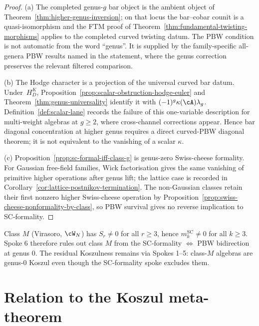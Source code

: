 \begin{proof}
(a) The completed genus-$g$ bar object is the ambient object of
Theorem~\ref{thm:higher-genus-inversion}; on that locus the
bar--cobar counit is a quasi-isomorphism and the FTM proof of
Theorem~\ref{thm:fundamental-twisting-morphisms} applies to the
completed curved twisting datum.  The PBW condition is not automatic
from the word ``genus''.  It is supplied by the family-specific
all-genera PBW results named in the statement, where the genus
correction preserves the relevant filtered comparison.

(b) The Hodge character is a projection of the universal curved bar
datum.  Under~$H_D^K$, Proposition~\ref{prop:scalar-obstruction-hodge-euler}
and Theorem~\ref{thm:genus-universality} identify it with
$(-1)^g\kappa(\cA)\lambda_g$.  Definition~\ref{def:scalar-lane}
records the failure of this one-variable description for multi-weight
algebras at $g\geq 2$, where cross-channel corrections appear.  Hence
bar diagonal concentration at higher genus requires a direct
curved-PBW diagonal theorem; it is not equivalent to the vanishing of
a scalar $\kappa$.

(c) Proposition~\ref{prop:sc-formal-iff-class-g} is genus-zero
Swiss-cheese formality.  For Gaussian free-field families, Wick
factorisation gives the same vanishing of primitive higher operations
after genus lift; the lattice case is recorded in
Corollary~\ref{cor:lattice-postnikov-termination}.  The non-Gaussian
classes retain their first nonzero higher Swiss-cheese operation by
Proposition~\ref{prop:swiss-cheese-nonformality-by-class}, so PBW
survival gives no reverse implication to SC-formality.
\end{proof}

\begin{remark}
\label{rem:spoke-6-class-M}
Class $M$ (Virasoro, $\cW_N$) has $S_r \neq 0$ for all $r \geq 3$,
hence $m_k^{\mathrm{SC}} \neq 0$ for all $k \geq 3$. Spoke 6
therefore rules out class $M$ from the SC-formality $\Leftrightarrow$
PBW bidirection at genus $0$. The residual Koszulness remains via
Spokes 1--5: class-$M$ algebras are genus-$0$ Koszul even though the
SC-formality spoke excludes them.
\end{remark}

\section{Relation to the Koszul meta-theorem}
\label{sec:ftm-relation-meta}

